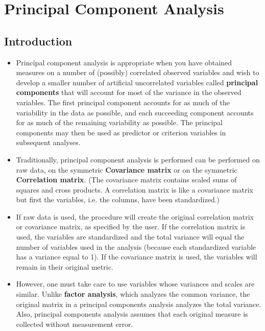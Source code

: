 \documentclass[a4paper,12pt]{article}
\begin{document}
\section{Principal Component Analysis }

\subsection{Introduction}
\begin{itemize}
	\item Principal component analysis is appropriate when you have obtained measures on a number of
	(possibly) correlated observed variables and wish to develop a smaller number of artificial uncorrelated variables called \textbf{principal components} that will account for most of the variance in the observed variables. The first principal component accounts for as much of the variability in the data as possible, and each succeeding component accounts for as much of the remaining variability as possible. The principal
	components may then be used as predictor or criterion variables in subsequent analyses.
	
	
\item Traditionally, principal component analysis is performed can be performed on raw data, on the symmetric \textbf{Covariance matrix} or on the symmetric \textbf{Correlation matrix}. (The covariance matrix contains scaled sums of squares and cross products. A correlation matrix is like a covariance matrix but first the variables, i.e. the columns, have been standardized.)
	
\item If raw data is used, the procedure will create the original correlation matrix or covariance matrix, as specified by the user.  If the correlation matrix is used, the variables are standardized and the total variance will equal the number of variables used in the analysis (because each standardized variable has a variance equal to 1).  If the covariance matrix is used, the variables will remain in their original metric. 
\item  However, one must take care to use variables whose variances and scales are similar.  Unlike \textbf{factor analysis}, which analyzes the common variance, the original matrix in a principal components analysis analyzes the total variance.  Also, principal components analysis assumes that each original measure is collected without measurement error.
\end{itemize}
\end{document}
